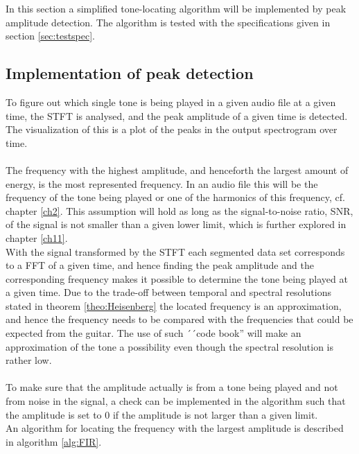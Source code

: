 \label{sec:peak_detection}
In this section a simplified tone-locating algorithm will be implemented by peak amplitude detection.
The algorithm is tested with the specifications given in section \ref{sec:testspec}.
\subsection{Implementation of peak detection}
To figure out which single tone is being played in a given audio file at a given time, the STFT is analysed, and the peak amplitude of a given time is detected.
The visualization of this is a plot of the peaks in the output spectrogram over time.
\\ \\
The frequency with the highest amplitude, and henceforth the largest amount of energy, is the most represented frequency. 
In an audio file this will be the frequency of the tone being played or one of the harmonics of this frequency, cf. chapter \ref{ch2}.
This assumption will hold as long as the signal-to-noise ratio, SNR, of the signal is not smaller than a given lower limit, which is further explored in chapter \ref{ch11}. \\
With the signal transformed by the STFT each segmented data set corresponds to a FFT of a given time, and hence finding the peak amplitude and the corresponding frequency makes it possible to determine the tone being played at a given time. Due to the trade-off between temporal and spectral resolutions stated in theorem \ref{theo:Heisenberg} the located frequency is an approximation, and hence the frequency needs to be compared with the frequencies that could be expected from the guitar.
The use of such ´´code book'' will make an approximation of the tone a possibility even though the spectral resolution is rather low.
\\ \\
To make sure that the amplitude actually is from a tone being played and not from noise in the signal, a check can be implemented in the algorithm such that the amplitude is set to $0$ if the amplitude is not larger than a given limit.\\
An algorithm for locating the frequency with the largest amplitude is described in algorithm \ref{alg:FIR}.
